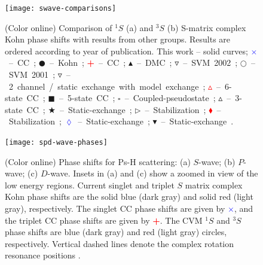 \documentclass[preprint,showpacs,showkeys,preprintnumbers,amsmath,amssymb,longbibliography,pra,aps]{revtex4-1}
\begin{document}
\begin{figure}[H]
	\centering
	\texttt{[image: swave-comparisons]}
	\caption{(Color online) Comparison of $^1S$ (a) and $^3S$ (b) S-matrix
complex Kohn phase shifts with results from other groups. Results are ordered
according to year of publication. This work -- solid curves;
\mbox{\textcolor{blue}{$\times$} -- CC \cite{Walters2004};}
\mbox{$\CIRCLE$ -- Kohn \cite{VanReeth2003};}
\mbox{\textcolor{red}{\textbf{+}} -- CC \cite{Blackwood2002};}
\mbox{$\blacktriangle$ -- DMC \cite{Chiesa2002};} 
\mbox{$\triangledown$ -- SVM 2002 \cite{Ivanov2002};} 
\mbox{$\Circle$ -- SVM 2001 \cite{Ivanov2001};} 
\mbox{\textcolor[RGB]{0,127,0}{$\triangledown$} -- 2 channel / static exchange with model exchange \cite{Biswas2001};} 
\mbox{\textcolor{red}{$\vartriangle$} -- 6-state CC \cite{Sinha2000};} 
\mbox{$\blacksquare$ -- 5-state CC \cite{Adhikari1999};} 
\mbox{$\square$ -- Coupled-pseudostate \cite{Campbell1998};} 
\mbox{$\vartriangle$ -- 3-state CC \cite{Sinha1997};} 
\mbox{\textcolor[RGB]{0,127,0}{$\bigstar$} -- Static-exchange \cite{Ray1997};} 
\mbox{$\triangleright$ -- Stabilization \cite{Drachman1976};} 
\mbox{\textcolor{red}{$\blacklozenge$} -- Stabilization \cite{Drachman1975};}
\mbox{\textcolor{blue}{$\lozenge$} -- Static-exchange \cite{Hara1975};}
\mbox{$\blacktriangledown$ -- Static-exchange \cite{Fraser1961}.}}
	\label{fig:swave-comparisons}
\end{figure}


\begin{figure}[H]
	\centering
	\texttt{[image: spd-wave-phases]}
	\caption{(Color online) Phase shifts for Ps-H scattering: (a) $S$-wave;
(b) $P$-wave; (c) $D$-wave. Insets in (a) and (c) show a zoomed in view of 
the low energy regions. Current singlet and triplet $S$ matrix complex Kohn
phase shifts are the solid blue (dark gray)
and solid red (light gray), respectively. The singlet CC phase shifts
\cite{Walters2004} are given by \mbox{\textcolor{blue}{$\times$}}, and the
triplet CC phase shifts \cite{Blackwood2002} are given by
\mbox{\textcolor{red}{\textbf{+}}}. The CVM $^1S$ and $^3S$ phase shifts
\cite{Zhang2012} are blue (dark gray) and red (light gray) circles,
respectively. Vertical dashed lines denote the complex rotation resonance
positions \cite{Yan1999,Yan1998a,Ho1998}.}
	\label{fig:spd-wave-phases}
\end{figure}
\end{document}
